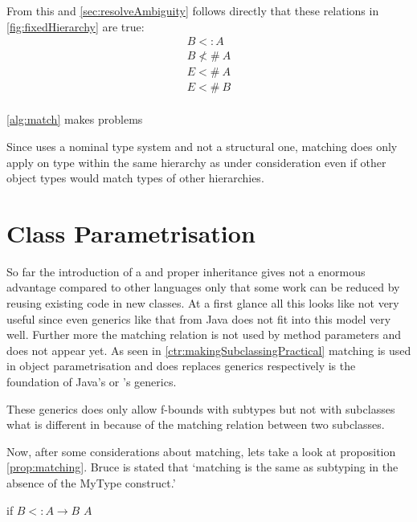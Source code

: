 From this and \cref{sec:resolveAmbiguity} follows directly that these
relations in \cref{fig:fixedHierarchy} are true:
\begin{align}
B <: A \\
B \nless\!\!\#~A \label{alg:match} \\
E <\!\!\#~A \\
E <\!\!\#~B \\
\end{align}

\ref{alg:match} makes problems


Since \ooplss uses a nominal type system and not a structural one,
matching does only apply on type within the same hierarchy as under
consideration even if other object types would match types of other
hierarchies.

\section{Class Parametrisation}
So far the introduction of a \mytype and proper inheritance gives not a
enormous advantage compared to other languages only that some work can
be reduced by reusing existing code in new classes. At a first glance
all this looks like not very useful since even generics like that from
Java does not fit into this model very well. Further more the matching
relation is not used by method parameters and does not appear yet. As
seen in \cref{ctr:makingSubclassingPractical} matching is used in object
parametrisation and does replaces generics respectively is the foundation
of Java's or \cs's generics.

These generics does only allow f-bounds with subtypes but not with
subclasses what is different in \ooplss because of the matching relation
between two subclasses.

Now, after some considerations about matching, lets take a look at
proposition \ref{prop:matching}. Bruce is stated that `matching is the same as
subtyping in the absence of the MyType construct.'

\begin{thm}
	\label{thm:matchinIsSubtyping}
	if $B <: A \rightarrow B$ \match $A$
\end{thm}

